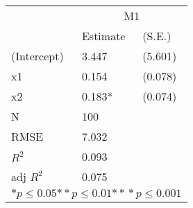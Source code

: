 \begin{tabular}{*{3}{l}}
\hline
                  & \multicolumn{2}{c}{M1}   \tabularnewline
                   &Estimate  &(S.E.)  \tabularnewline
 \hline
 \hline
   (Intercept)     &3.447   &   (5.601) \tabularnewline
   x1              &0.154   &   (0.078) \tabularnewline
   x2              &0.183*   &   (0.074) \tabularnewline
 \hline
 N                 &100       &        \tabularnewline
 RMSE             &7.032         & \tabularnewline
 $R^2$             &0.093         & \tabularnewline
 adj $R^2$         &0.075         & \tabularnewline
 \hline
\hline
 
 \multicolumn{3}{c}{${*  p}\le 0.05$${*\!\!*  p}\le 0.01$${*\!\!*\!\!*  p}\le 0.001$}\tabularnewline
 \end{tabular}